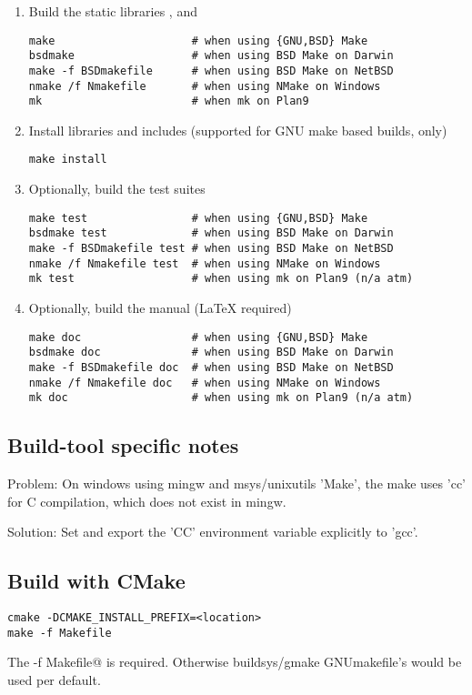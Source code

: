 \begin{enumerate}
\item Build the static libraries ,  and 
\begin{lstlisting}
make                     # when using {GNU,BSD} Make
bsdmake                  # when using BSD Make on Darwin
make -f BSDmakefile      # when using BSD Make on NetBSD
nmake /f Nmakefile       # when using NMake on Windows
mk                       # when mk on Plan9
\end{lstlisting}
\item Install libraries and includes (supported for GNU make based builds, only)
\begin{lstlisting}
make install 
\end{lstlisting}
\item Optionally, build the test suites
\begin{lstlisting}
make test                # when using {GNU,BSD} Make
bsdmake test             # when using BSD Make on Darwin
make -f BSDmakefile test # when using BSD Make on NetBSD
nmake /f Nmakefile test  # when using NMake on Windows
mk test                  # when using mk on Plan9 (n/a atm)
\end{lstlisting}%
\item Optionally, build the manual (LaTeX required)
\begin{lstlisting}
make doc                 # when using {GNU,BSD} Make
bsdmake doc              # when using BSD Make on Darwin
make -f BSDmakefile doc  # when using BSD Make on NetBSD
nmake /f Nmakefile doc   # when using NMake on Windows
mk doc                   # when using mk on Plan9 (n/a atm)
\end{lstlisting}%
\end{enumerate}

\subsection{Build-tool specific notes}

Problem: On windows using mingw and msys/unixutils 'Make', the make uses
'cc' for C compilation, which does not exist in mingw.

Solution: Set and export the 'CC' environment variable explicitly to 'gcc'. 

\subsection{Build with CMake}

\begin{lstlisting}
cmake -DCMAKE_INSTALL_PREFIX=<location>
make -f Makefile
\end{lstlisting}

The \verb@-f Makefile@ is required. Otherwise buildsys/gmake GNUmakefile's 
would be used per default.


